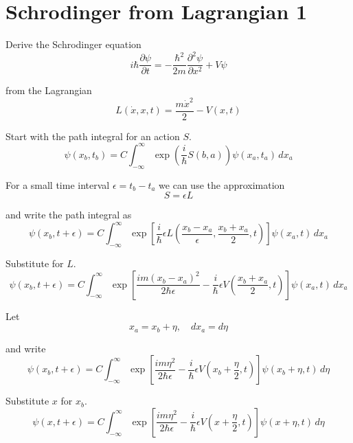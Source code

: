

\section*{Schrodinger from Lagrangian 1}

Derive the Schrodinger equation
\begin{equation*}
i\hbar\frac{\partial\psi}{\partial t}=-\frac{\hbar^2}{2m}\frac{\partial^2\psi}{\partial x^2}+V\psi
\end{equation*}

from the Lagrangian
\begin{equation*}
L(\dot x,x,t)=\frac{m\dot x^2}{2}-V(x,t)
\end{equation*}

Start with the path integral for an action $S$.
\begin{equation*}
\psi(x_b,t_b)=C\int_{-\infty}^\infty\exp\left(\frac{i}{\hbar}S(b,a)\right)\psi(x_a,t_a)\,dx_a
\end{equation*}

For a small time interval $\epsilon=t_b-t_a$ we can use the approximation
\begin{equation*}
S=\epsilon L
\end{equation*}

and write the path integral as
\begin{equation*}
\psi(x_b,t+\epsilon)=C\int_{-\infty}^\infty
\exp\left[\frac{i}{\hbar}\epsilon L\left(\frac{x_b-x_a}{\epsilon},\frac{x_b+x_a}{2},t\right)\right]
\psi(x_a,t)\,dx_a
\end{equation*}

Substitute for $L$.
\begin{equation*}
\psi(x_b,t+\epsilon)=C\int_{-\infty}^\infty
\exp\left[\frac{im(x_b-x_a)^2}{2\hbar\epsilon}
-\frac{i}{\hbar}\epsilon V\left(\frac{x_b+x_a}{2},t\right)\right]\psi(x_a,t)\,dx_a
\end{equation*}

Let
\begin{equation*}
x_a=x_b+\eta,\quad dx_a=d\eta
\end{equation*}

and write
\begin{equation*}
\psi(x_b,t+\epsilon)=C\int_{-\infty}^\infty
\exp\left[\frac{im\eta^2}{2\hbar\epsilon}
-\frac{i}{\hbar}\epsilon V\left(x_b+\frac{\eta}{2},t\right)\right]\psi(x_b+\eta,t)\,d\eta
\end{equation*}

Substitute $x$ for $x_b$.
\begin{equation*}
\psi(x,t+\epsilon)=C\int_{-\infty}^\infty
\exp\left[\frac{im\eta^2}{2\hbar\epsilon}
-\frac{i}{\hbar}\epsilon V\left(x+\frac{\eta}{2},t\right)\right]\psi(x+\eta,t)\,d\eta
\end{equation*}

